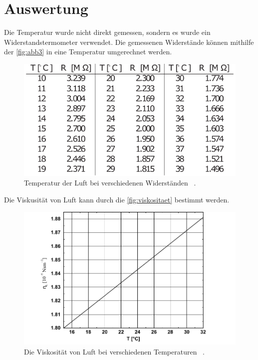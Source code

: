 \section{Auswertung}

Die Temperatur wurde nicht direkt gemessen, sondern es wurde ein Widerstandstermometer verwendet.
Die gemessenen Widerstände können mithilfe der \autoref{fig:abb3} in eine Temperatur umgerechnet werden.
\begin{figure}[H]
  \centering
  \includegraphics{figures/Temperatur.pdf}
  \caption{Temperatur der Luft bei verschiedenen Widerständen \cite{ap12}\, .} 
  \label{fig:abb3}
\end{figure}
Die Viskusität von Luft kann durch die \autoref{fig:viskositaet} bestimmt werden.
\begin{figure}[H]
  \centering
  \includegraphics{figures/Viskositaet.pdf}
  \caption{Die Viskosität von Luft bei verschiedenen Temperaturen  \cite{ap12}\, .} 
  \label{fig:viskositaet}
\end{figure}




